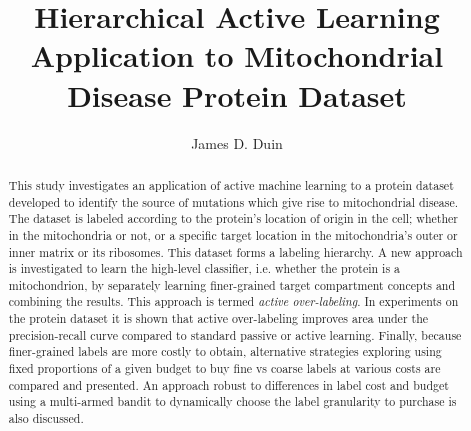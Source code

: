 \documentclass[ms]{nuthesis}
\begin{document}
\frontmatter

\title{Hierarchical Active Learning Application to Mitochondrial Disease Protein Dataset}
\author{James D. Duin}
\maketitle
\begin{abstract}
This study investigates an application of active machine learning to
a protein dataset developed to identify the source of mutations
which give rise to mitochondrial disease.
The dataset is labeled according to the protein's location of origin
in the cell; whether in the mitochondria or not, or a specific target
location in the
mitochondria's outer or inner matrix or its ribosomes. This dataset
 forms a labeling hierarchy.
 A new approach is investigated to learn the high-level classifier, i.e.
 whether the protein is a mitochondrion, by separately learning
 finer-grained target compartment concepts and combining the results. This
 approach is termed \textit{active over-labeling}.
 In experiments on the protein dataset it is shown that
 active over-labeling improves area under the precision-recall curve
 compared to standard passive or active learning.
 Finally, because finer-grained labels are more costly to obtain, alternative
 strategies exploring using fixed proportions of a given budget to buy
  fine vs coarse labels at various costs are compared and presented.
  An approach robust to differences in label cost and budget using
  a multi-armed bandit to dynamically choose the label granularity to purchase
  is also discussed.
\end{abstract}

\end{document}
